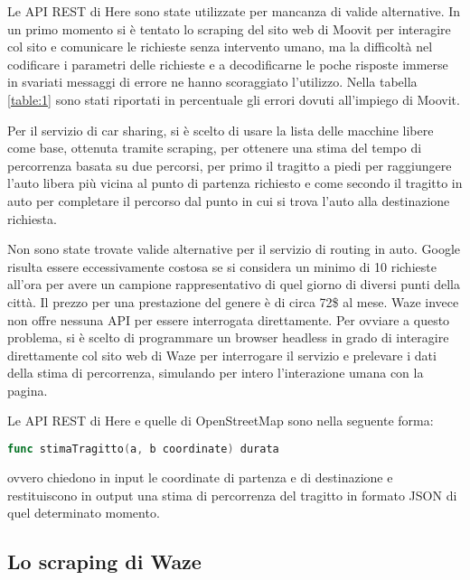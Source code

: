Le API REST di Here sono state utilizzate per mancanza di valide alternative. In un primo momento si è tentato lo scraping del sito web di Moovit per interagire col sito e comunicare le richieste senza intervento umano, ma la difficoltà nel codificare i parametri delle richieste e a decodificarne le poche risposte immerse in svariati messaggi di errore ne hanno scoraggiato l'utilizzo. Nella tabella \ref{table:1} sono stati riportati in percentuale gli errori dovuti all'impiego di Moovit.

Per il servizio di car sharing, si è scelto di usare la lista delle macchine libere come base, ottenuta tramite scraping, per ottenere una stima del tempo di percorrenza basata su due percorsi, per primo il tragitto a piedi per raggiungere l'auto libera più vicina al punto di partenza richiesto e come secondo il tragitto in auto per completare il percorso dal punto in cui si trova l'auto alla destinazione richiesta.

Non sono state trovate valide alternative per il servizio di routing in auto. Google risulta essere eccessivamente costosa se si considera un minimo di 10 richieste all'ora per avere un campione rappresentativo di quel giorno di diversi punti della città. Il prezzo per una prestazione del genere è di circa 72\$ al mese. Waze invece non offre nessuna API per essere interrogata direttamente. Per ovviare a questo problema, si è scelto di programmare un browser headless in grado di interagire direttamente col sito web di Waze per interrogare il servizio e prelevare i dati della stima di percorrenza, simulando per intero l'interazione umana con la pagina.

Le API REST di Here e quelle di OpenStreetMap sono nella seguente forma:
\begin{lstlisting}[language=Go]
func stimaTragitto(a, b coordinate) durata
\end{lstlisting}
ovvero chiedono in input le coordinate di partenza e di destinazione e restituiscono in output una stima di percorrenza del tragitto in formato JSON di quel determinato momento.

\subsection{Lo scraping di Waze}

